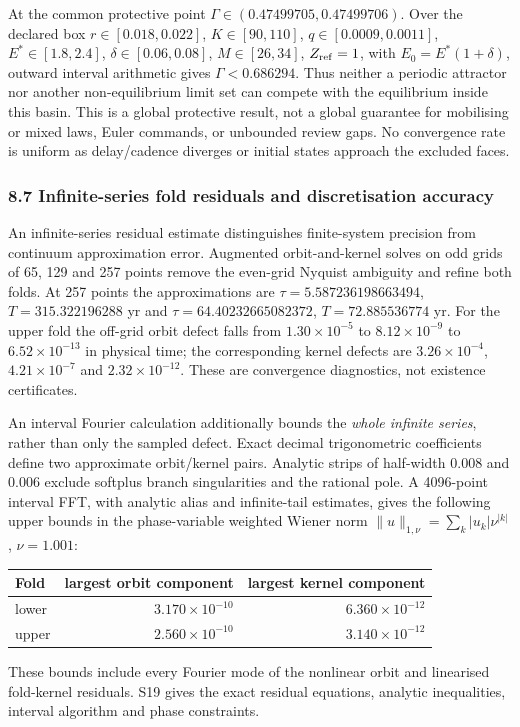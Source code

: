 At the common protective point $\Gamma\in(0.47499705,0.47499706)$.
Over the declared box $r\in[0.018,0.022]$, $K\in[90,110]$,
$q\in[0.0009,0.0011]$, $E^*\in[1.8,2.4]$,
$\delta\in[0.06,0.08]$, $M\in[26,34]$, $Z_{\rm ref}=1$,
with $E_0=E^*(1+\delta)$, outward interval arithmetic gives
$\Gamma<0.686294$. Thus neither a periodic attractor nor another
non-equilibrium limit set can compete with the equilibrium inside this
basin. This is a global protective result, not a global guarantee for
mobilising or mixed laws, Euler commands, or unbounded review gaps.
No convergence rate is uniform as delay/cadence diverges or initial
states approach the excluded faces.

\subsubsection{8.7 Infinite-series fold residuals and discretisation accuracy}
\label{infinite-fold-residuals}
An infinite-series residual estimate distinguishes finite-system
precision from continuum approximation error. Augmented orbit-and-kernel solves on odd grids
of 65, 129 and 257 points remove the even-grid Nyquist ambiguity and
refine both folds. At 257 points the approximations are
$\tau=5.587236198663494$, $T=315.322196288$ yr and
$\tau=64.40232665082372$, $T=72.885536774$ yr.
For the upper fold the off-grid orbit defect falls from
$1.30\times10^{-5}$ to $8.12\times10^{-9}$ to $6.52\times10^{-13}$
in physical time; the corresponding kernel defects are
$3.26\times10^{-4}$, $4.21\times10^{-7}$ and $2.32\times10^{-12}$.
These are convergence diagnostics, not existence certificates.

An interval Fourier calculation additionally bounds the \emph{whole
infinite series}, rather than only the sampled defect. Exact decimal
trigonometric coefficients define two approximate orbit/kernel pairs.
Analytic strips of half-width $0.008$ and $0.006$ exclude softplus branch
singularities and the rational pole. A 4096-point interval FFT, with
analytic alias and infinite-tail estimates, gives the following upper
bounds in the phase-variable weighted Wiener norm
$\|u\|_{1,\nu}=\sum_k|u_k|\nu^{|k|}$, $\nu=1.001$:
\begin{center}\small
\begin{tabular}{lrr}
\toprule Fold & largest orbit component & largest kernel component\\\midrule
lower & $3.170\times10^{-10}$ & $6.360\times10^{-12}$\\
upper & $2.560\times10^{-10}$ & $3.140\times10^{-12}$\\\bottomrule
\end{tabular}
\end{center}
These bounds include every Fourier mode of the nonlinear orbit and
linearised fold-kernel residuals. S19 gives the exact residual equations,
analytic inequalities, interval algorithm and phase constraints.

